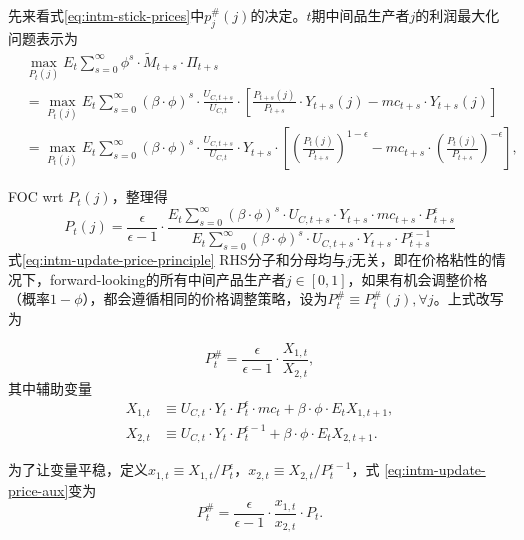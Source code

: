 先来看式\eqref{eq:intm-stick-prices}中$p^{\#}_j(j)$的决定。$t$期中间品生产者$j$的利润最大化问题表示为
\begin{equation*}
  \begin{split}
    &\max_{P_t(j)} E_t \sum_{s=0}^{\infty} \phi^s \cdot \widetilde{M}_{t+s} \cdot \Pi_{t+s} \\
    &=\max_{P_t(j)} E_t \sum_{s=0}^{\infty} \left(\beta \cdot \phi \right)^s \cdot \frac{U_{C,t+s}}{U_{C,t}} \cdot \left[
      \frac{P_{t+s}(j)}{P_{t+s}} \cdot Y_{t+s}(j) - mc_{t+s} \cdot Y_{t+s}(j)
    \right]\\
    &=\max_{P_t(j)} E_t \sum_{s=0}^{\infty} \left(\beta \cdot \phi \right)^s \cdot \frac{U_{C,t+s}}{U_{C,t}} \cdot Y_{t+s} \cdot
    \left[
      \left( \frac{P_{t}(j)}{P_{t+s}} \right)^{1-\epsilon} - mc_{t+s} \cdot \left( \frac{P_{t}(j)}{P_{t+s}} \right)^{-\epsilon}
    \right],
  \end{split}
\end{equation*}

FOC wrt $P_{t}(j)$，整理得
\begin{equation}
  \label{eq:intm-update-price-principle}
  P_{t}(j) = \frac{\epsilon}{\epsilon -1} \cdot \frac
{
  E_t \sum_{s=0}^{\infty} \left(\beta \cdot \phi \right)^s \cdot U_{C,t+s} \cdot Y_{t+s} \cdot mc_{t+s} \cdot P_{t+s}^{\epsilon}
}
{
  E_t \sum_{s=0}^{\infty} \left(\beta \cdot \phi \right)^s \cdot U_{C,t+s} \cdot Y_{t+s} \cdot P_{t+s}^{\epsilon-1}
}
\end{equation}
式\eqref{eq:intm-update-price-principle} RHS分子和分母均与$j$无关，即在价格粘性的情况下，forward-looking的所有中间产品生产者$j\in[0,1]$，如果有机会调整价格（概率$1-\phi$），都会遵循相同的价格调整策略，设为$P^{\#}_{t} \equiv P^{\#}_{t}(j), \forall j$。上式改写为

\begin{equation}
  \label{eq:intm-update-price-aux}
  P^{\#}_t = \frac{\epsilon}{\epsilon  -1} \cdot \frac{X_{1,t}}{X_{2,t}},
\end{equation}
其中辅助变量
\begin{align}
\label{auxiliary-X1}
  X_{1,t} &\equiv U_{C,t} \cdot Y_t \cdot P_{t}^{\epsilon} \cdot mc_t + \beta \cdot \phi \cdot E_t X_{1,t+1},\\
\label{auxiliary-X2}
  X_{2,t} &\equiv U_{C,t} \cdot Y_t \cdot P_{t}^{\epsilon-1} + \beta \cdot \phi \cdot E_t X_{2,t+1}.
\end{align}

为了让变量平稳，定义$x_{1,t} \equiv X_{1,t}/P_{t}^{\epsilon}$，$x_{2,t} \equiv X_{2,t}/P_{t}^{\epsilon-1}$，式  \eqref{eq:intm-update-price-aux}变为
\begin{equation}
  \label{eq:intm-update-price-aux-stationary}
  P^{\#}_t = \frac{\epsilon}{\epsilon  -1} \cdot \frac{x_{1,t}}{x_{2,t}} \cdot P_t.
\end{equation}


